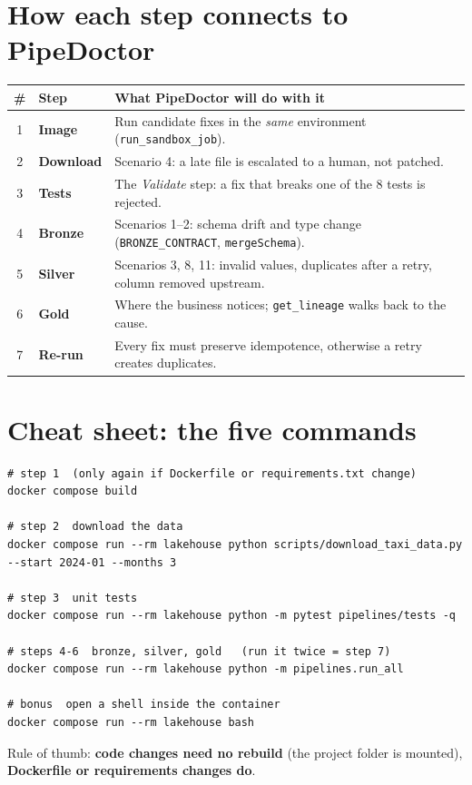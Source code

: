 \documentclass[11pt,a4paper]{article}
\let\oldsection\section
\renewcommand{\section}{\Needspace*{9\baselineskip}\oldsection}
\begin{document}
\section{How each step connects to PipeDoctor}
\begin{tabularx}{\textwidth}{@{}c>{\bfseries}p{2.4cm}X@{}}
\toprule
\# & Step & What PipeDoctor will do with it \\
\midrule
1 & Image & Run candidate fixes in the \emph{same} environment (\texttt{run\_sandbox\_job}). \\
2 & Download & Scenario 4: a late file is escalated to a human, not patched. \\
3 & Tests & The \emph{Validate} step: a fix that breaks one of the 8 tests is rejected. \\
4 & Bronze & Scenarios 1--2: schema drift and type change (\texttt{BRONZE\_CONTRACT}, \texttt{mergeSchema}). \\
5 & Silver & Scenarios 3, 8, 11: invalid values, duplicates after a retry, column removed upstream. \\
6 & Gold & Where the business notices; \texttt{get\_lineage} walks back to the cause. \\
7 & Re-run & Every fix must preserve idempotence, otherwise a retry creates duplicates. \\
\bottomrule
\end{tabularx}

\section{Cheat sheet: the five commands}
\begin{lstlisting}[style=cmd]
# step 1  (only again if Dockerfile or requirements.txt change)
docker compose build

# step 2  download the data
docker compose run --rm lakehouse python scripts/download_taxi_data.py --start 2024-01 --months 3

# step 3  unit tests
docker compose run --rm lakehouse python -m pytest pipelines/tests -q

# steps 4-6  bronze, silver, gold   (run it twice = step 7)
docker compose run --rm lakehouse python -m pipelines.run_all

# bonus  open a shell inside the container
docker compose run --rm lakehouse bash
\end{lstlisting}
Rule of thumb: \textbf{code changes need no rebuild} (the project folder is mounted), \textbf{Dockerfile or requirements changes do}.
\end{document}
